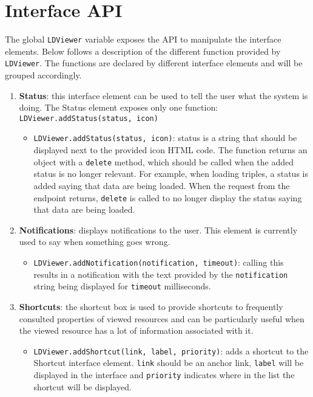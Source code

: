 \documentclass{article}
\begin{document}
\section{Interface API}
\label{sec:ldapi}
The global \texttt{LDViewer} variable exposes the API to manipulate the interface elements.
Below follows a description of the different function provided by \texttt{LDViewer}.
The functions are declared by different interface elements and will be grouped accordingly.
\begin{enumerate}
\item \textbf{Status}: this interface element can be used to tell the user what the system is doing.
The Status element exposes only one function: \texttt{LDViewer.addStatus(status, icon)}
\begin{itemize}
\item \texttt{LDViewer.addStatus(status, icon)}: status is a string that should be displayed next to the provided icon HTML code.
The function returns an object with a \texttt{delete} method, which should be called when the added status is no longer relevant.
For example, when loading triples, a status is added saying that data are being loaded.
When the request from the endpoint returns, \texttt{delete} is called to no longer display the status saying that data are being loaded.
\end{itemize}

\item \textbf{Notifications}: displays notifications to the user.
This element is currently used to say when something goes wrong.
\begin{itemize}
\item \texttt{LDViewer.addNotification(notification, timeout)}: calling this results in a notification with the text provided by the \texttt{notification} string being displayed for \texttt{timeout} milliseconds.
\end{itemize}

\item \textbf{Shortcuts}: the shortcut box is used to provide shortcuts to frequently consulted properties of viewed resources and can be particularly useful when the viewed resource has a lot of information associated with it.
\begin{itemize}
\item \texttt{LDViewer.addShortcut(link, label, priority)}: adds a shortcut to the Shortcut interface element. \texttt{link} should be an anchor link, \texttt{label} will be displayed in the interface and \texttt{priority} indicates where in the list the shortcut will be displayed.
\end{itemize}


\end{enumerate}
\end{document}
